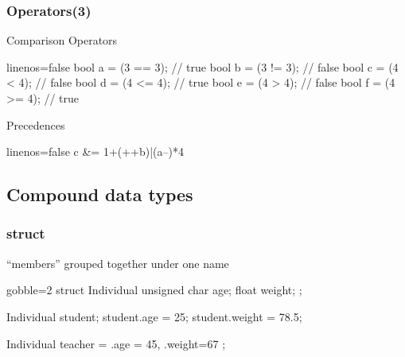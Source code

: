 \begin{frame}[fragile]
  \frametitle{Operators(3)}
  \begin{block}{Comparison Operators}
    \begin{cppcode*}{linenos=false}
      bool a = (3 == 3);  // true
      bool b = (3 != 3);  // false
      bool c = (4 < 4);   // false
      bool d = (4 <= 4);  // true
      bool e = (4 > 4);   // false
      bool f = (4 >= 4);  // true
    \end{cppcode*}
  \end{block}
  \pause
  \begin{block}{Precedences }
    \begin{cppcode*}{linenos=false}
      c &= 1+(++b)|(a--)*4%
    \end{cppcode*}
  \end{block}
\end{frame}

\subsection[Compound]{Compound data types}

\begin{frame}[fragile]
  \frametitle{struct}
  \begin{mdframed}[style=simplebox]
    \center ``members'' grouped together under one name
  \end{mdframed}
  \begin{multicols}{2}
    \begin{cppcode*}{gobble=2}
      struct Individual {
        unsigned char age;
        float weight;
      };

      Individual student;
      student.age = 25;
      student.weight = 78.5;

      Individual teacher = {
        .age = 45,
        .weight=67
      };
    \end{cppcode*}
    \pause
    \columnbreak
    \null \vfill
    \hspace{-1.5cm}
    \vfill \null
  \end{multicols}
\end{frame}

